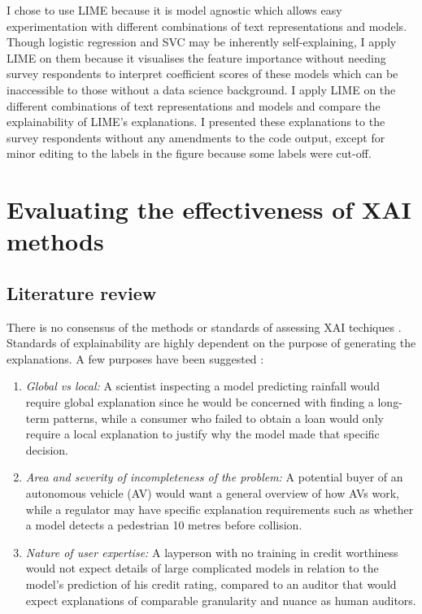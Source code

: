 I chose to use LIME because it is model agnostic which allows easy experimentation with different combinations of text representations and models. Though logistic regression and SVC may be inherently self-explaining, I apply LIME on them because it visualises the feature importance without needing survey respondents to interpret coefficient scores of these models which can be inaccessible to those without a data science background. I apply LIME on the different combinations of text representations and models and compare the explainability of LIME's explanations. I presented these explanations to the survey respondents without any amendments to the code output, except for minor editing to the labels in the figure because some labels were cut-off.

\section{Evaluating the effectiveness of XAI methods}
\subsection{Literature review}
There is no consensus of the methods or standards of assessing XAI techiques \cite{vilone2021}. Standards of explainability are highly dependent on the purpose of generating the explanations. A few purposes have been suggested \cite{doshi-velez2017}:
\begin{enumerate}
	\item \textit{Global vs local:} A scientist inspecting a model predicting rainfall would require global explanation since he would be concerned with finding a long-term patterns, while a consumer who failed to obtain a loan would only require a local explanation to justify why the model made that specific decision.
	\item \textit{Area and severity of incompleteness of the problem:} A potential buyer of an autonomous vehicle (AV) would want a general overview of how AVs work, while a regulator may have specific explanation requirements such as whether a model detects a pedestrian 10 metres before collision.
	\item \textit{Nature of user expertise:} A layperson with no training in credit worthiness would not expect details of large complicated models in relation to the model's prediction of his credit rating, compared to an auditor that would expect explanations of comparable granularity and nuance as human auditors.
\end{enumerate}

